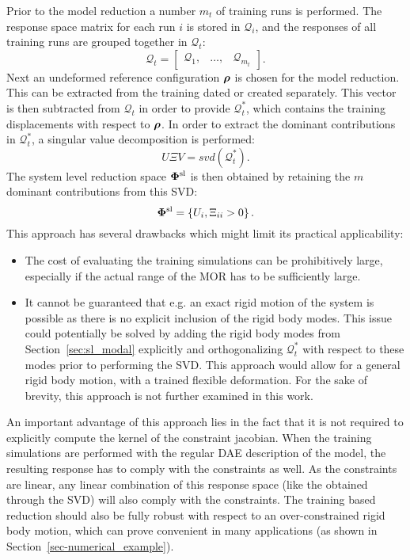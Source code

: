 Prior to the model reduction a number $m_t$ of training runs is performed. The response space matrix for each run $i$ is stored in $\mathcal{Q}_i$, and the responses of all training runs are grouped together in $\mathcal{Q}_t$:
\begin{equation}
\mathcal{Q}_t = \begin{bmatrix} \mathcal{Q}_1, & \ldots ,& \mathcal{Q}_{m_t} \end{bmatrix}.
\end{equation}
Next an undeformed reference configuration $\bm \rho$ is chosen for the model reduction. This can be extracted from the training dated or created separately. This vector is then subtracted from $\mathcal{Q}_t$ in order to provide $\mathcal{Q}_t^*$, which contains the training displacements with respect to $\bm \rho$.
In order to extract the dominant contributions in $\mathcal{Q}_t^*$, a singular value decomposition is performed:
\begin{equation}
U\Xi V = svd(\mathcal{Q}_t^*).
\end{equation}
The system level reduction space $\bm \Phi^{\rm sl}$ is then obtained by retaining the $m$ dominant contributions from this SVD:
\begin{equation}
\bm \Phi^{\rm sl} = \left\{U_i, \Xi_{ii} > 0\right\}. 
\end{equation}
This approach has several drawbacks which might limit its practical applicability:
\begin{itemize}
\item The cost of evaluating the training simulations can be prohibitively large, especially if the actual range of the MOR has to be sufficiently large.
\item It cannot be guaranteed that e.g. an exact rigid motion of the system is possible as there is no explicit inclusion of the rigid body modes. 
This issue could potentially be solved by adding the rigid body modes from Section~\ref{sec:sl_modal} explicitly and orthogonalizing $\mathcal{Q}_t^*$ with respect to these modes prior to performing the SVD. This approach would allow for a general rigid body motion, with a trained flexible deformation. For the sake of brevity, this approach is not further examined in this work. 
\end{itemize}
An important advantage of this approach lies in the fact that it is not required to explicitly compute the kernel of the constraint jacobian. When the training simulations are performed with the regular DAE description of the model, the resulting response has to comply with the constraints as well. As the constraints are linear, any linear combination of this response space (like the obtained through the SVD) will also comply with the constraints.
The training based reduction should also be fully robust with respect to an over-constrained rigid body motion, which can prove convenient in many applications (as shown in Section~\ref{sec-numerical_example}). 



